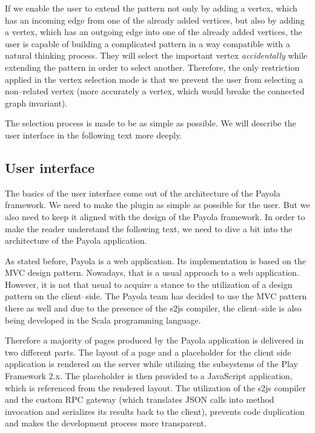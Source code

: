If we enable the user to extend the pattern not only by adding a vertex, 
which has an incoming edge from one of the already added vertices, but also by adding 
a vertex, which has an outgoing edge into one of the already added vertices, 
the user is capable of building a complicated pattern in a way compatible with a natural thinking process.
They will select the
important vertex \emph{accidentally} while extending the 
pattern in order to select another. Therefore, the only restriction 
applied in the vertex selection mode is that we prevent the user from selecting 
a non--related vertex (more accurately a vertex, which would breake the connected 
graph invariant).

The selection process is made to be as simple as possible. We will describe the 
user interface in the following text more deeply.

\subsection{User interface}
The basics of the user interface come out of the architecture of the Payola 
framework. We need to make the plugin as simple as possible for the user. But we 
also need to keep it aligned with the design of the Payola framework. In order to 
make the reader understand the following text, we need to dive a bit into the 
architecture of the Payola application.

As stated before, Payola is a web application. Its implementation is based on the MVC 
design pattern. Nowadays, that is a usual approach to a web application. However, it is not that usual 
to acquire a stance to the utilization of a design pattern on the client--side. The 
Payola team has decided to use the MVC pattern there as well and due to 
the presence of the s2js compiler, the client--side is also being developed in 
the Scala programming language.

Therefore a majority of pages produced by the Payola application is delivered 
in two different parts. The layout of a page and a placeholder for the client 
side application is rendered on the server while utilizing the subsystems of the 
Play Framework 2.x. The placeholder is then provided to a JavaScript application,
which is referenced from the rendered layout. The utilization of the s2js compiler and
the custom RPC gateway (which translates JSON calls into method invocation and serializes its results
back to the client), prevents code duplication and makes the development process more transparent.

